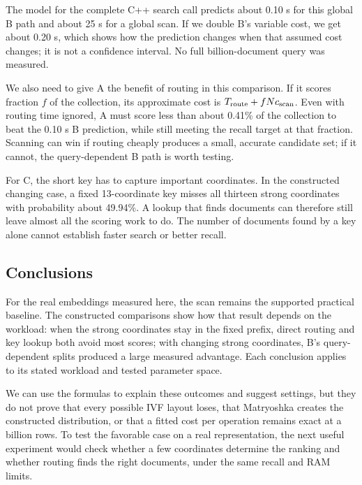The model for the complete C++ search call predicts about 0.10 s for this global B path and about 25 s
for a global scan. If we double B's variable cost, we get about 0.20 s, which shows how the prediction changes
when that assumed cost changes; it is not a confidence interval. No full billion-document query was measured.

We also need to give A the benefit of routing in this comparison. If it scores fraction $f$
of the collection, its approximate cost is $T_{\rm route}+fNc_{\rm scan}$. Even with routing
time ignored, A must score less than about 0.41\% of the collection to beat the 0.10 s B
prediction, while still meeting the recall target at that fraction. Scanning can win if
routing cheaply produces a small, accurate candidate set; if it cannot, the query-dependent
B path is worth testing.


For C, the short key has to capture important coordinates. In the constructed changing case,
a fixed 13-coordinate key misses all thirteen strong coordinates with probability about
49.94\%. A lookup that finds documents can therefore still leave almost all the scoring work to do.
The number of documents found by a key alone cannot establish faster search or better recall.

\subsection{Conclusions}
For the real embeddings measured here, the scan remains the supported practical baseline.
The constructed comparisons show how that result depends on the workload: when the strong coordinates
stay in the fixed prefix, direct routing and key lookup both avoid most scores; with changing
strong coordinates, B's query-dependent splits produced a large measured advantage. Each
conclusion applies to its stated workload and tested parameter space.

We can use the formulas to explain these outcomes and suggest settings, but they do not
prove that every possible IVF layout loses, that Matryoshka creates the constructed
distribution, or that a fitted cost per operation remains exact at a billion rows. To test
the favorable case on a real representation, the next useful experiment would check whether a few coordinates determine the ranking
and whether routing finds the right documents, under the same recall and RAM limits.
